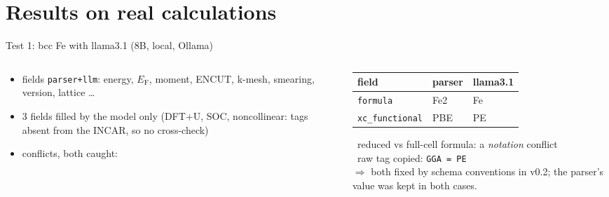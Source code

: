 \documentclass[aspectratio=169,10pt,t]{beamer}
\newcommand{\code}[1]{\texttt{#1}}
\begin{document}
\section{Results on real calculations}

\begin{frame}{Test 1: bcc Fe with llama3.1 (8B, local, Ollama)}
\begin{columns}[T]
\begin{column}{0.46\textwidth}
\small
\begin{itemize}
\item \textcolor{good}{ fields} \texttt{parser+llm}: energy, \(E_{\mathrm F}\), moment, ENCUT, k-mesh, smearing, version, lattice \dots
\item 3 fields filled by the model only (DFT+U, SOC, noncollinear: tags absent from the INCAR, so no cross-check)
\item \textcolor{llm}{ conflicts}, both caught:
\end{itemize}
\end{column}
\begin{column}{0.5\textwidth}
\footnotesize
\begin{tabular}{@{}lll@{}}
\toprule
field & \textcolor{parser}{parser} & \textcolor{llm}{llama3.1}\\\midrule
\code{formula} & Fe2 & Fe \\
\code{xc\_functional} & PBE & PE \\
\bottomrule
\end{tabular}
\vspace{2mm}

\textbullet\ reduced vs full-cell formula: a \emph{notation} conflict\\
\textbullet\ raw tag copied: \code{GGA = PE}\\[2pt]
\(\Rightarrow\) both fixed by schema conventions in v0.2; the parser's value was kept in both cases.
\end{column}
\end{columns}
\end{frame}
\end{document}
